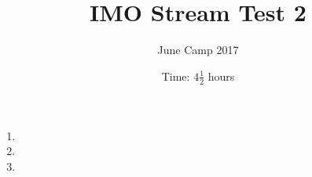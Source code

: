 \documentclass{article}
\title{IMO Stream Test 2}
\author{June Camp 2017}
\date{Time: $4\frac{1}{2}$ hours}
\begin{document}
 \maketitle

\begin{enumerate}

\item %
	

\item %
	

\item %
		

\end{enumerate}
\end{document}
